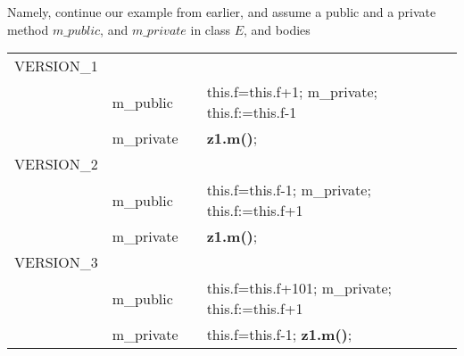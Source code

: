 Namely, continue our example from earlier, and assume a public and a private method $m\_public$, and $m\_private$ in class $E$, and bodies\\
\begin{tabular}{clclcl}
VERSION\_1\\
& m\_public & & this.f=this.f+1; m\_private; this.f:=this.f-1 \\
& m\_private & &\textbf{z1.m()};\\
VERSION\_2\\
& m\_public & & this.f=this.f-1; m\_private; this.f:=this.f+1 \\
& m\_private & &\textbf{z1.m()};\\
VERSION\_3\\
& m\_public & & this.f=this.f+101; m\_private; this.f:=this.f+1 \\
& m\_private & &this.f=this.f-1; \textbf{z1.m()};
\end{tabular}

